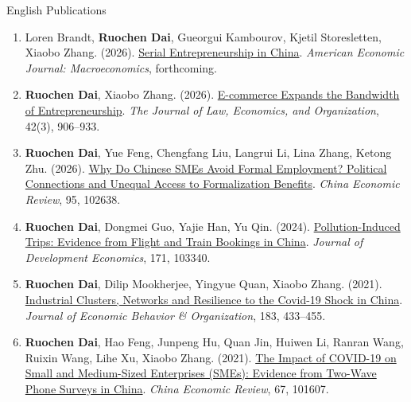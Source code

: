 \documentclass{resume} %
\begin{document}
\clearpage
\begin{rSection}{English Publications}
\begin{enumerate}
\item Loren Brandt, \textbf{Ruochen Dai}, Gueorgui Kambourov, Kjetil Storesletten, Xiaobo Zhang. (2026). \href{https://ruochendai-econ.github.io/papers/serial-entrepreneurship.pdf}{Serial Entrepreneurship in China}. \emph{American Economic Journal: Macroeconomics}, forthcoming.

\item \textbf{Ruochen Dai}, Xiaobo Zhang. (2026). \href{https://ruochendai-econ.github.io/papers/ecommerce-entrepreneurship.pdf}{E-commerce Expands the Bandwidth of Entrepreneurship}. \emph{The Journal of Law, Economics, and Organization}, 42(3), 906--933.

\item \textbf{Ruochen Dai}, Yue Feng, Chengfang Liu, Langrui Li, Lina Zhang, Ketong Zhu. (2026). \href{https://ruochendai-econ.github.io/papers/sme-formal-employment.pdf}{Why Do Chinese SMEs Avoid Formal Employment? Political Connections and Unequal Access to Formalization Benefits}. \emph{China Economic Review}, 95, 102638.

\item \textbf{Ruochen Dai}, Dongmei Guo, Yajie Han, Yu Qin. (2024). \href{https://ruochendai-econ.github.io/papers/pollution-induced-trips.pdf}{Pollution-Induced Trips: Evidence from Flight and Train Bookings in China}. \emph{Journal of Development Economics}, 171, 103340.

\item \textbf{Ruochen Dai}, Dilip Mookherjee, Yingyue Quan, Xiaobo Zhang. (2021). \href{https://ruochendai-econ.github.io/papers/clusters-covid.pdf}{Industrial Clusters, Networks and Resilience to the Covid-19 Shock in China}. \emph{Journal of Economic Behavior \& Organization}, 183, 433--455.

\item \textbf{Ruochen Dai}, Hao Feng, Junpeng Hu, Quan Jin, Huiwen Li, Ranran Wang, Ruixin Wang, Lihe Xu, Xiaobo Zhang. (2021). \href{https://ruochendai-econ.github.io/papers/smes-covid.pdf}{The Impact of COVID-19 on Small and Medium-Sized Enterprises (SMEs): Evidence from Two-Wave Phone Surveys in China}. \emph{China Economic Review}, 67, 101607.
\end{enumerate}
\end{rSection}
\end{document}

